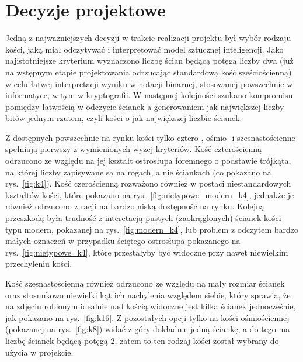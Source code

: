 \section{Decyzje projektowe}\label{sec:decyzje-projektowe}

Jedną z najważniejszych decyzji w trakcie realizacji projektu był wybór rodzaju kości, jaką miał odczytywać
i interpretować model sztucznej inteligencji.
Jako najistotniejsze kryterium wyznaczono liczbę ścian będącą potęgą liczby dwa
(już na wstępnym etapie projektowania odrzucając standardową kość sześciościenną)
w celu łatwej interpretacji wyniku w notacji binarnej, stosowanej powszechnie w informatyce, w tym w kryptografii.
W następnej kolejności szukano kompromisu pomiędzy łatwością w odczycie ścianek a generowaniem jak największej liczby
bitów jednym rzutem, czyli kości o jak największej liczbie ścianek.

Z dostępnych powszechnie na rynku kości tylko cztero-, ośmio- i szesnastościenne spełniają pierwszy z wymienionych wyżej kryteriów.
Kość czterościenną odrzucono ze względu na jej kształt ostrosłupa foremnego o podstawie trójkąta,
na której liczby zapisywane są na rogach, a nie ściankach (co pokazano na rys.~\ref{fig:k4}).
Kość czerościenną rozważono również w postaci niestandardowych kształtów kości, które pokazano na rys.~\ref{fig:nietypowe_modern_k4},
jednakże je również odrzucono z racji na bardzo niską dostępność na rynku. Kolejną przeszkodą była trudność
z interetacją pustych (zaokrąglonych) ścianek kości typu modern, pokazanej na rys.~\ref{fig:modern_k4},
lub problem z odczytem bardzo małych oznaczeń w przypadku ściętego ostrosłupa pokazanego na rys.~\ref{fig:nietypowe_k4}, 
które przestałyby być widoczne przy nawet niewielkim przechyleniu kości.

Kość szesnastościenną również odrzucono ze względu na mały rozmiar ścianek oraz stosunkowo niewielki kąt ich nachylenia względem siebie,
który sprawia, że na zdjęciu robionym idealnie nad kością widoczne jest kilka ścianek jednocześnie, jak pokazano na rys.~\ref{fig:k16}.
Z pozostałych opcji tylko na kości ośmiościennej (pokazanej na rys.~\ref{fig:k8}) widać z góry dokładnie jedną ściankę,
a do tego ma liczbę ścianek będącą potęgą 2, zatem to ten rodzaj kości został wybrany do użycia w projekcie.

